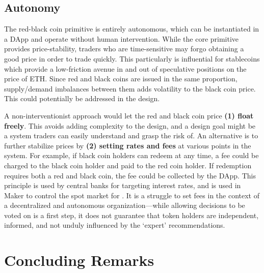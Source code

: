 

\subsection{Autonomy} 

The red-black coin primitive is entirely autonomous, which can be instantiated in a DApp and operate without human intervention. While the core primitive provides price-stability, traders who are time-sensitive may forgo obtaining a good price in order to trade quickly. This particularly is influential for stablecoins which provide a low-friction avenue in and out of speculative positions on the price of ETH. Since red and black coins are issued in the same proportion, supply/demand imbalances between them adds volatility to the black coin price. This could potentially be addressed in the design. 

A non-interventionist approach would let the red and black coin price \textbf{(1) float freely}. This avoids adding complexity to the design, and a design goal might be a system traders can easily understand and grasp the risk of. An alternative is to further stabilize prices by \textbf{(2) setting rates and fees} at various points in the system. For example, if black coin holders can redeem at any time, a fee could be charged to the black coin holder and paid to the red coin holder. If redemption requires both a red and black coin, the fee could be collected by the DApp. This principle is used by central banks for targeting interest rates, and is used in Maker to control the spot market for \dai. It is a struggle to set fees in the context of a decentralized and autonomous organization---while allowing decisions to be voted on is a first step, it does not guarantee that token holders are independent, informed, and not unduly influenced by the `expert' recommendations. 


\section{Concluding Remarks}

